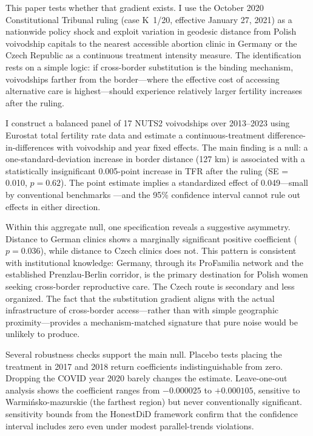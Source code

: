 \documentclass[12pt]{article}
\begin{document}
This paper tests whether that gradient exists. I use the October 2020 Constitutional Tribunal ruling (case K~1/20, effective January 27, 2021) as a nationwide policy shock and exploit variation in geodesic distance from Polish voivodship capitals to the nearest accessible abortion clinic in Germany or the Czech Republic as a continuous treatment intensity measure. The identification rests on a simple logic: if cross-border substitution is the binding mechanism, voivodships farther from the border---where the effective cost of accessing alternative care is highest---should experience relatively larger fertility increases after the ruling.

I construct a balanced panel of 17 NUTS2 voivodships over 2013--2023 using Eurostat total fertility rate data and estimate a continuous-treatment difference-in-differences with voivodship and year fixed effects. The main finding is a null: a one-standard-deviation increase in border distance (127 km) is associated with a statistically insignificant 0.005-point increase in TFR after the ruling (SE = 0.010, $p = 0.62$). The point estimate implies a standardized effect of 0.049---small by conventional benchmarks \citep{duflo2004}---and the 95\% confidence interval cannot rule out effects in either direction.

Within this aggregate null, one specification reveals a suggestive asymmetry. Distance to German clinics shows a marginally significant positive coefficient ($p = 0.036$), while distance to Czech clinics does not. This pattern is consistent with institutional knowledge: Germany, through its ProFamilia network and the established Prenzlau-Berlin corridor, is the primary destination for Polish women seeking cross-border reproductive care. The Czech route is secondary and less organized. The fact that the substitution gradient aligns with the actual infrastructure of cross-border access---rather than with simple geographic proximity---provides a mechanism-matched signature that pure noise would be unlikely to produce.

Several robustness checks support the main null. Placebo tests placing the treatment in 2017 and 2018 return coefficients indistinguishable from zero. Dropping the COVID year 2020 barely changes the estimate. Leave-one-out analysis shows the coefficient ranges from $-0.000025$ to $+0.000105$, sensitive to Warmi\'{n}sko-mazurskie (the farthest region) but never conventionally significant. \citet{rambachan2023} sensitivity bounds from the HonestDiD framework confirm that the confidence interval includes zero even under modest parallel-trends violations.
\end{document}
